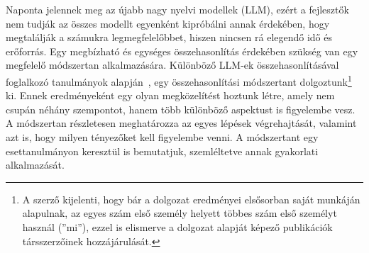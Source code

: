 \documentclass[12pt,a4paper]{extarticle}
\begin{document}
Naponta jelennek meg az újabb nagy nyelvi modellek (LLM), ezért a fejlesztők nem tudják az összes modellt egyenként kipróbálni annak érdekében, hogy megtalálják a számukra legmegfelelőbbet, hiszen nincsen rá elegendő idő és erőforrás.
Egy megbízható és egységes össze\-ha\-son\-lí\-tás érdekében szükség van egy megfelelő módszertan alkalmazására.
Kü\-lön\-bö\-ző LLM-ek össze\-ha\-son\-lí\-tá\-sá\-val foglalkozó tanulmányok alapján~\cite{copilot_code_evaluation,copilot_code_evaluation2, copilot_code_evaluation_3}, egy össze\-ha\-son\-lí\-tá\-si módszertant dolgoztunk\footnote{A szerző kijelenti, hogy bár a dolgozat eredményei elsősorban saját munkáján alapulnak, az egyes szám első személy helyett többes szám első személyt használ (''mi''), ezzel is elismerve a dolgozat alapját képező publikációk társszerzőinek hozzájárulását.} ki.
Ennek eredményeként egy olyan megközelítést hoztunk létre, amely nem csupán néhány szempontot, hanem több különböző aspektust is figyelembe vesz.
A módszertan részletesen meghatározza az egyes lépések végrehajtását, valamint azt is, hogy milyen tényezőket kell figyelembe venni.
A módszertant egy esettanulmányon keresztül is bemutatjuk, szem\-lél\-tet\-ve annak gyakorlati alkalmazását.
\end{document}
